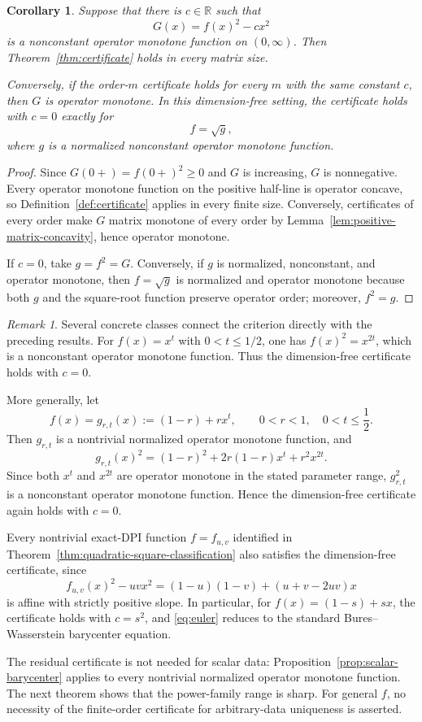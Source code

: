 \documentclass[11pt]{amsart}
\newtheorem{corollary}[theorem]{Corollary}
\theoremstyle{definition}
\theoremstyle{remark}
\newtheorem{remark}[theorem]{Remark}
\begin{document}
	\begin{corollary}
		\label{cor:dimension-free-certificate}
		Suppose that there is $c\in\mathbb R$ such that
		\[
			G(x)=f(x)^2-cx^2
		\]
		is a nonconstant operator monotone function on $(0,\infty)$.  Then
		Theorem~\ref{thm:certificate} holds in every matrix size.
		
		Conversely, if the order-$m$ certificate holds for every $m$ with
		the same constant $c$, then $G$ is operator monotone.  In this
		dimension-free setting, the certificate holds with $c=0$ exactly for
		\[
			f=\sqrt g,
		\]
		where $g$ is a normalized nonconstant operator monotone function.
	\end{corollary}
	
	\begin{proof}
		Since $G(0+)=f(0+)^2\ge0$ and $G$ is increasing, $G$ is
		nonnegative.  Every operator monotone function on the positive half-line
		is operator concave, so Definition~\ref{def:certificate} applies in every
		finite size.  Conversely, certificates of every order make $G$ matrix
		monotone of every order by
		Lemma~\ref{lem:positive-matrix-concavity}, hence operator monotone.
		
		If $c=0$, take $g=f^2=G$.  Conversely, if $g$ is normalized,
		nonconstant, and operator monotone, then $f=\sqrt g$ is normalized and
		operator monotone because both $g$ and the square-root function preserve
		operator order; moreover, $f^2=g$.
	\end{proof}
	
	\begin{remark}
		\label{rem:certificate-examples}
	Several concrete classes connect the criterion directly with the preceding
	results.  For $f(x)=x^t$ with $0<t\le1/2$, one has
	$f(x)^2=x^{2t}$, which is a nonconstant operator monotone function.
	Thus the dimension-free certificate holds with $c=0$.
	
	More generally, let
	\[
	f(x)=g_{r,t}(x):=(1-r)+rx^t,
	\qquad
	0<r<1,\quad 0<t\le\frac12.
	\]
	Then $g_{r,t}$ is a nontrivial normalized operator monotone function, and
	\[
	g_{r,t}(x)^2
	=(1-r)^2+2r(1-r)x^t+r^2x^{2t}.
	\]
	Since both $x^t$ and $x^{2t}$ are operator monotone in the stated
	parameter range, $g_{r,t}^2$ is a nonconstant operator monotone function.
	Hence the dimension-free certificate again holds with $c=0$.
	
Every nontrivial exact-DPI function $f=f_{u,v}$ identified in
Theorem~\ref{thm:quadratic-square-classification} also satisfies the
dimension-free certificate, since
\[
f_{u,v}(x)^2-uvx^2
=(1-u)(1-v)+(u+v-2uv)x
\]
is affine with strictly positive slope.  In particular, for
	$f(x)=(1-s)+sx$, the certificate holds with $c=s^2$, and
	\eqref{eq:euler} reduces to the standard Bures--Wasserstein barycenter
	equation.
		
		The residual certificate is not needed for scalar data:
		Proposition~\ref{prop:scalar-barycenter} applies to every nontrivial
		normalized operator monotone function.  The next theorem shows that the
		power-family range is sharp.  For general $f$, no necessity of the
		finite-order certificate for arbitrary-data uniqueness is asserted.
	\end{remark}
	
\end{document}

